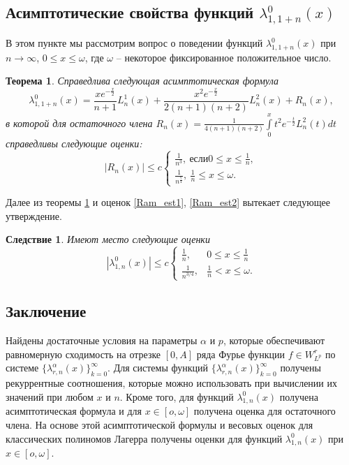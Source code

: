 \documentclass[a4paper,12pt]{article}
\newtheorem{theorem}{Теорема}
\newtheorem{corollary}{Следствие}
\begin{document}
\subsection{Асимптотические свойства функций $\lambda_{1,1+n}^{0}(x)$}
В этом пункте мы рассмотрим вопрос о поведении функций $\lambda_{1,1+n}^{0}(x)$ при $n\rightarrow\infty$, $0\leq x\leq \omega$, где $\omega$ -- некоторое фиксированное положительное число.
\begin{theorem}\label{Ramtheo3}
Справедлива следующая асимптотическая формула
\begin{equation*}
\lambda_{1,1+n}^{0}(x) = \frac{xe^{-\frac{x}{2}}}{n+1}L_n^1(x)+\frac{x^2e^{-\frac{x}{2}}}{2(n+1)(n+2)}L_n^2(x)+R_n(x),
\end{equation*}
в которой для остаточного члена $R_n(x)=\frac{1}{4(n+1)(n+2)}\int\limits_0^x t^2e^{-\frac{t}{2}}L_{n}^{2}(t)dt$ справедливы следующие оценки:
\begin{equation*}
|R_n(x)|\leq
c \left\{\begin{gathered}
\frac{1}{n^3},\ если 0\leq x\leq \frac{1}{n},\\
\frac{1}{n^\frac{7}{4}},\ \frac{1}{n}\leq x\leq \omega.
\end{gathered}\right.
\end{equation*}
\end{theorem}
Далее из теоремы \ref{Ramtheo3} и оценок \eqref{Ram_est1}, \eqref{Ram_est2} вытекает следующее утверждение.
\begin{corollary}
Имеют место следующие оценки
$$
|\lambda_{1,n}^{0}(x)|\leq c
\begin{cases}
  \frac{1}{n}, & 0\leq x\leq \frac{1}{n} \\
  \frac{1}{n^{3/4}}, & \frac{1}{n}< x\leq \omega.
\end{cases}
$$
\end{corollary}

\subsection{Заключение}
Найдены достаточные условия на параметры $\alpha$ и $p$, которые обеспечивают равномерную сходимость на отрезке $[0,A]$ ряда Фурье функции $f\in W_{L^p}^r$ по системе $\{\lambda_{r,n}^{\alpha}(x)\}_{k=0}^\infty$. Для системы функций $\{\lambda_{r,n}^{\alpha}(x)\}_{k=0}^\infty$ получены рекуррентные соотношения, которые можно использовать при вычислении их значений при любом $x$ и $n$. Кроме того, для функций $\lambda_{1,n}^{0}(x)$ получена асимптотическая формула и для $x\in[o,\omega]$ получена оценка для остаточного члена. На основе этой асимптотической формулы и весовых оценок для классических полиномов Лагерра получены оценки для функций $\lambda_{1,n}^{0}(x)$ при $x\in[o,\omega]$.
\end{document}
